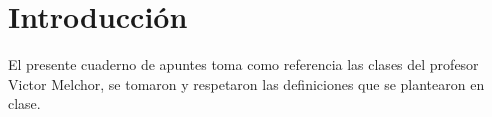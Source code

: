 
\chapter{Introducción}

El presente cuaderno de apuntes toma como referencia las clases del profesor Victor Melchor, se tomaron y respetaron las definiciones que se plantearon en clase.
